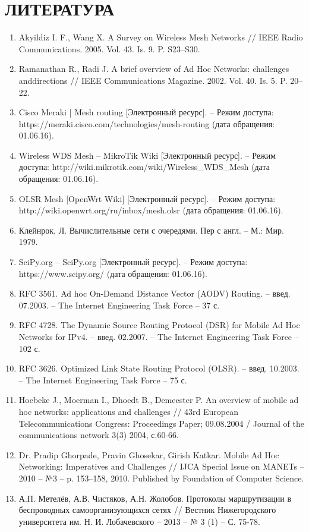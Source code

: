 \documentclass[14pt,a4paper,titlepage]{extarticle}
\newcommand{\nnumsection}[1]{%
	\clearpage
	\addcontentsline{toc}{section}{#1}
	\section*{#1}
}
\begin{document}
\nnumsection{ЛИТЕРАТУРА}
\begin{enumerate}
\item Akyildiz I. F., Wang X. A Survey on Wireless Mesh Networks // IEEE Radio Communications. 2005. Vol. 43. Is. 9. P. S23--S30.
\item Ramanathan R., Radi J. A brief overview of Ad Hoc Networks: challenges anddirections // IEEE Communications Magazine. 2002. Vol. 40. Is. 5. P. 20--22.
\item Cisco Meraki | Mesh routing [Электронный ресурс]. -- Режим доступа: https://meraki.cisco.com/technologies/mesh-routing (дата обращения: 01.06.16).
\item Wireless WDS Mesh -- MikroTik Wiki [Электронный ресурс]. -- Режим доступа: http://wiki.mikrotik.com/wiki/Wireless\_WDS\_Mesh (дата обращения: 01.06.16).
\item OLSR Mesh [OpenWrt Wiki] [Электронный ресурс]. -- Режим доступа: http://wiki.openwrt.org/ru/inbox/mesh.olsr (дата обращения: 01.06.16).
\item Клейнрок, Л. Вычислительные сети с очередями. Пер с англ. -- М.: Мир. 1979.
\item SciPy.org -- SciPy.org [Электронный ресурс]. -- Режим доступа: https://www.scipy.org/ (дата обращения: 01.06.16).
\item RFC 3561. Ad hoc On-Demand Distance Vector (AODV) Routing. -- введ. 07.2003. -- The Internet Engineering Task Force -- 37 с.
\item RFC 4728. The Dynamic Source Routing Protocol (DSR) for Mobile Ad Hoc Networks for IPv4. -- введ. 02.2007. -- The Internet Engineering Task Force -- 102 с.
\item RFC 3626. Optimized Link State Routing Protocol (OLSR). -- введ. 10.2003. -- The Internet Engineering Task Force -- 75 с.
\item Hoebeke J., Moerman I., Dhoedt B., Demeester P. An overview of mobile ad hoc networks: applications and challenges // 43rd European Telecommunications Congress: Proceedings Paper; 09.08.2004 / Journal of the communications network 3(3) 2004, с.60-66.
\item Dr. Pradip Ghorpade, Pravin Ghosekar, Girish Katkar. Mobile Ad Hoc Networking: Imperatives and Challenges // IJCA Special Issue on MANETs -- 2010 -- №3 -- p. 153--158, 2010. Published by Foundation of Computer Science.
\item А.П. Метелёв, А.В. Чистяков, А.Н. Жолобов. Протоколы маршрутизации в беспроводных самоорганизующихся сетях // Вестник Нижегородского университета им. Н. И. Лобачевского -- 2013 -- № 3 (1) -- С. 75-78.

\end{enumerate}
\end{document}

